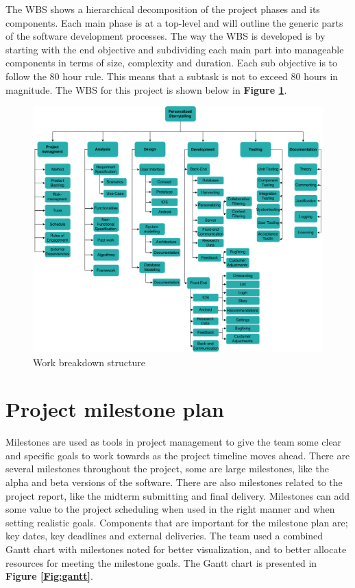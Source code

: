 The WBS shows a hierarchical decomposition of the project phases and its components. Each main phase is at a top-level and will outline the generic parts of the software development processes. The way the WBS is developed is by starting with the end objective and subdividing each main part into manageable components in terms of size, complexity and duration. Each sub objective is to follow the 80 hour rule. This means that a subtask is not to exceed 80 hours in magnitude. The WBS for this project is shown below in \textbf{Figure \ref{Fig:wbs}}. %

\begin{figure}[h!]
	\begin{center}
		\advance\leftskip-3cm
		\advance\rightskip-3cm
		\includegraphics[keepaspectratio=true,scale=0.43]{fig/wbs}
		\caption{Work breakdown structure}
		\label{Fig:wbs}
	\end{center}
\end{figure}

\section{Project milestone plan}
\label{sec:milestone_plan}

Milestones are used as tools in project management to give the team some clear and specific goals to work towards as the project timeline moves ahead. There are several milestones throughout the project, some are large milestones, like the alpha and beta versions of the software. There are also milestones related to the project report, like the midterm submitting and final delivery. Milestones can add some value to the project scheduling when used in the right manner and when setting realistic goals. Components that are important for the milestone plan are; key dates, key deadlines and external deliveries. The team used a combined Gantt chart with milestones noted for better visualization, and to better allocate resources for meeting the milestone goals. The Gantt chart is presented in \textbf{Figure \ref{Fig:gantt}}.\newline


